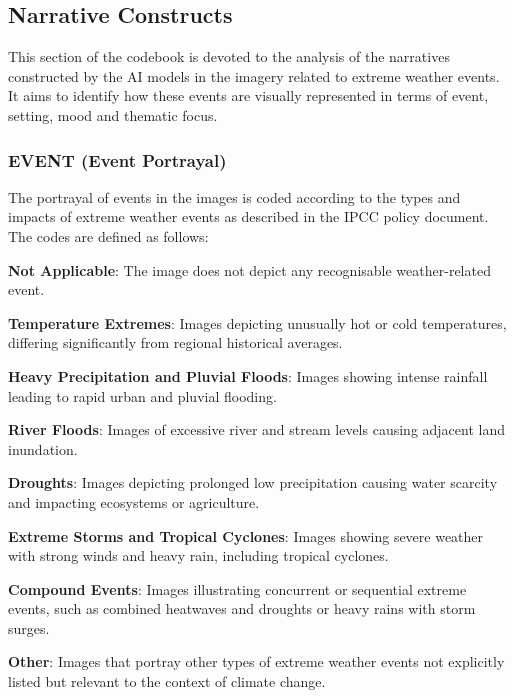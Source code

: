 \subsection{Narrative Constructs}
\label{subsec:narrative-constructs}
This section of the codebook is devoted to the analysis of the narratives constructed by the AI models in the imagery related to extreme weather events. It aims to identify  how these events are visually represented in terms of event, setting, mood and thematic focus. 

\subsubsection*{EVENT (Event Portrayal)}
The portrayal of events in the images is coded according to the types and impacts of extreme weather events as described in the IPCC policy document. The codes are defined as follows:

\begin{description}[leftmargin=2.5cm, style = multiline, labelwidth=1.5cm]
\item[0] \textbf{Not Applicable}: The image does not depict any recognisable weather-related event.
\item[1] \textbf{Temperature Extremes}: Images depicting unusually hot or cold temperatures, differing significantly from regional historical averages.
\item[2] \textbf{Heavy Precipitation and Pluvial Floods}: Images showing intense rainfall leading to rapid urban and pluvial flooding.
\item[3] \textbf{River Floods}: Images of excessive river and stream levels causing adjacent land inundation.
\item[4] \textbf{Droughts}: Images depicting prolonged low precipitation causing water scarcity and impacting ecosystems or agriculture.
\item[5] \textbf{Extreme Storms and Tropical Cyclones}: Images showing severe weather with strong winds and heavy rain, including tropical cyclones.
\item[6] \textbf{Compound Events}: Images illustrating concurrent or sequential extreme events, such as combined heatwaves and droughts or heavy rains with storm surges.
\item[7] \textbf{Other}: Images that portray other types of extreme weather events not explicitly listed but relevant to the context of climate change.
\end{description}

